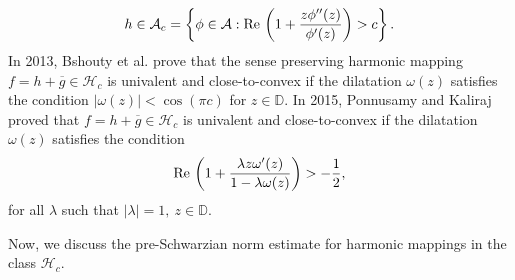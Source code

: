 \documentclass[a4paper,12pt]{amsart}
\theoremstyle{definition}
\begin{document}
	   \begin{align*}
	   h\in\mathcal{A}_c=	\left\{\phi\in\mathcal{A}:{\rm Re\,}\left(1+\frac{z\phi''(z)}{\phi'(z)}\right)>c\right\}.
	   \end{align*}  
In 2013, Bshouty et al. \cite{Bshouty-Joshi-Joshi-2013}   
prove that the sense preserving harmonic mapping $f=h+\overline{g}\in\mathcal{H}_c$ is univalent and close-to-convex if the dilatation $\omega(z)$
satisfies the condition $|\omega(z)|<\cos{(\pi c)}$ for $z\in\mathbb{D}$. In 2015, Ponnusamy and Kaliraj \cite{Ponnusamy-Kaliraj-2015} proved that  $f=h+\overline{g}\in\mathcal{H}_c$ is univalent and close-to-convex if the dilatation $\omega(z)$
satisfies the condition
\begin{align*}
{\rm Re\,}\left(1+\frac{\lambda z\omega'(z)}{1-\lambda\omega(z)}\right)>-\frac{1}{2},
\end{align*}
for all $\lambda$ such that $|\lambda|=1,~z\in\mathbb{D}$.

Now, we discuss the pre-Schwarzian norm estimate for harmonic mappings in the class $\mathcal{H}_c.$ 
\end{document}
